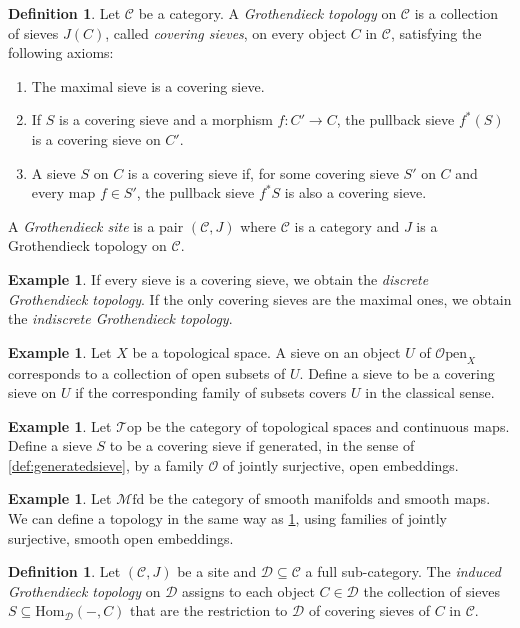 \documentclass[10pt]{amsart}
\newcommand{\C}{\mathscr{C}}
\newcommand{\D}{\mathscr{D}}
\newcommand{\Hom}{\mathrm{Hom}}
\newcommand{\Top}{\mathscr{T}\mathrm{op}}
\newcommand{\Mfd}{\mathscr{M}\mathrm{fd}}
\newcommand{\Open}{\mathscr{O}\mathrm{pen}}
\theoremstyle{definition}
\newtheorem{definition}[equation]{Definition}
\newtheorem{example}[equation]{Example}
\theoremstyle{remark}
\numberwithin{equation}{section}
\begin{document}
	\begin{definition}
		Let $\C$ be a category. A \emph{Grothendieck topology} on $\C$ is a collection of sieves $J(C)$, called \textit{covering sieves}, on every object $C$ in $\C$, satisfying the following axioms:
		\begin{enumerate}
			\item The maximal sieve is a covering sieve.
			\item If $S$ is a covering sieve and a morphism $f\colon C' \to C$, the pullback sieve $f^*(S)$ is a covering sieve on $C'$.
			\item A sieve $S$ on $C$ is a covering sieve if, for some covering sieve $S'$ on $C$ and every map $f\in S'$, the pullback sieve $f^*S$ is also a covering sieve. 
		\end{enumerate}
		A \emph{Grothendieck site} is a pair $(\C, J)$ where $\C$ is a category and $J$ is a Grothendieck topology on $\C$.
	\end{definition}
	\begin{example}If every sieve is a covering sieve, we obtain the \emph{discrete Grothendieck topology}. If the only covering sieves are the maximal ones, we obtain the \textit{indiscrete Grothendieck topology}.
	\end{example}
	\begin{example}
		Let $X$ be a topological space. A sieve on an object $U$ of $\Open_X$ corresponds to a collection of open subsets of $U$. Define a sieve to be a covering sieve on $U$ if the corresponding family of subsets covers $U$ in the classical sense.
	\end{example}
	\begin{example}\label{ex:top}
		Let $\Top$ be the category of topological spaces and continuous maps. Define a sieve $S$ to be a covering sieve if generated, in the sense of \cref{def:generatedsieve}, by a family $\mathscr O$ of jointly surjective, open embeddings. 
	\end{example}
	\begin{example}Let $\Mfd$ be the category of smooth manifolds and smooth maps. We can define a topology in the same way as \cref{ex:top}, using families of jointly surjective, smooth open embeddings. 
	\end{example}
	\begin{definition}\label{def:indtop}
		Let $(\C,J)$ be a site and $\D\subseteq\C$ a full sub-category. The \emph{induced Grothendieck topology} on $\D$ assigns to each object $C\in\D$ the collection of sieves $S\subseteq\Hom_{\D}(-,C)$ that are the restriction to $\D$ of covering sieves of $C$ in $\C$.
	\end{definition}
\end{document}
